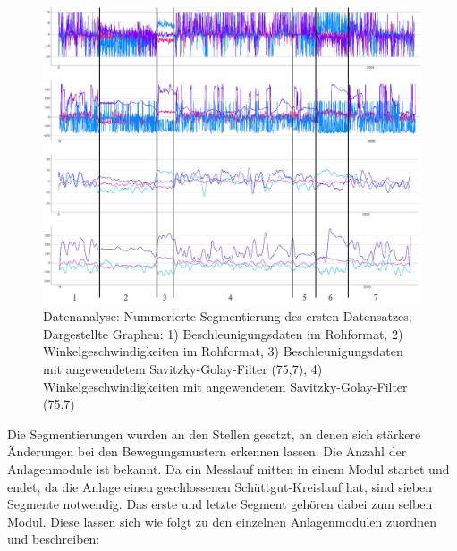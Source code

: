 \begin{figure}[htb]
	\centering
	\includegraphics[width=1\linewidth]{images/k5-segmentierung.JPG}
	\caption{Datenanalyse: Nummerierte Segmentierung des ersten Datensatzes; Dargestellte Graphen: 1) Beschleunigungsdaten im Rohformat, 2) Winkelgeschwindigkeiten im Rohformat, 3)  Beschleunigungsdaten mit angewendetem Savitzky-Golay-Filter (75,7), 4) Winkelgeschwindigkeiten mit angewendetem Savitzky-Golay-Filter (75,7)}
	\label{fig:k5_segmentierung}
\end{figure}

Die Segmentierungen wurden an den Stellen gesetzt, an denen sich stärkere Änderungen bei den Bewegungsmustern erkennen lassen. Die Anzahl der Anlagenmodule ist bekannt. Da ein Messlauf mitten in einem Modul startet und endet, da die Anlage einen geschlossenen Schüttgut-Kreislauf hat, sind sieben Segmente notwendig. Das erste und letzte Segment gehören dabei zum selben Modul. Diese lassen sich wie folgt zu den einzelnen Anlagenmodulen zuordnen und beschreiben:

